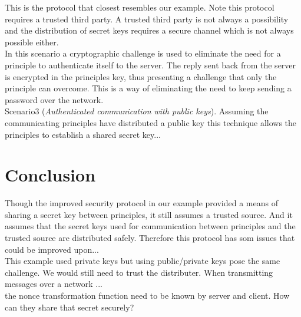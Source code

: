 This is the protocol that closest resembles our example. Note this protocol requires a trusted third party. A trusted third party is not always a possibility and the distribution of secret keys requires a secure channel which is not always possible either. \\

In this scenario a cryptographic challenge is used to eliminate the need for a principle to authenticate itself to the server. The reply sent back from the server is encrypted in the principles key, thus presenting a challenge that only the principle can overcome. This is a way of eliminating the need to keep sending a password over the network.\\

Scenario3 (\textit{Authenticated communication with public keys}). Assuming the communicating principles have distributed a public key this technique allows the principles to establish a shared secret key...\\

 

  

\section{Conclusion}

Though the improved security protocol in our example provided a means of sharing a secret key between principles, it still assumes a trusted source. And it assumes that the secret keys used for communication between principles and the trusted source are distributed safely. Therefore this protocol has som issues that could be improved upon... \\

This example used private keys but using public/private keys pose the same challenge. We would still need to trust the distributer. When transmitting messages over a network ...   \\

the nonce transformation function need to be known by server and client. How can they share that secret securely?















